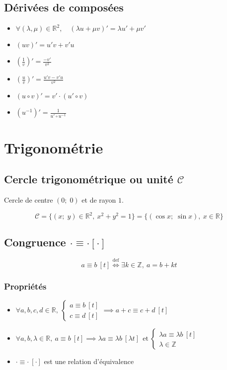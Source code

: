 \documentclass{article}
\newcommand{\R}{{\mathbb R}}
\newcommand{\Z}{{\mathbb Z}}
\newcommand{\et}{\:\text{et}\:}
\newcommand{\point}[2]{(#1;\;#2)}
\renewcommand{\cong}{\equiv}
\begin{document}
\subsection{Dérivées de composées}
\begin{itemize}
	\item $\forall (\lambda, \mu) \in \R^2,\quad (\lambda u + \mu v)' = \lambda u' + \mu v'$
	\item $(uv)' = u'v+v'u$
	\item $(\frac{1}{v})' = \frac{-v'}{v^2}$
	\item $(\frac{u}{v})' = \frac{u'v-v'u}{v^2}$
	\item $(u \circ v)' = v' \cdot  (u' \circ v)$
	\item $(u^{-1})' = \frac{1}{u' \circ u^{-1}}$
\end{itemize}

\newpage
\section{Trigonométrie}
\subsection{Cercle trigonométrique ou unité $\mathcal C$}

Cercle de centre $\point{0}{0}$ et de rayon $1$.

\[
	\mathcal C = \{ \point{x}{y} \in \R^2,\: x^2 + y^2 = 1 \} = \{ \point{\cos x}{\sin x},\: x \in \R \} 
\] 

\subsection{Congruence $\cdot \cong \cdot [\cdot]$}

\[
	a \cong b\ [t] \stackrel{\text{def}}{\iff} \exists k\in \Z,\ a = b + kt

\] 
\subsubsection{Propriétés}

\begin{itemize}
	\item $\forall a, b, c, d\in \R,\ \begin{cases}
			a \cong b\ [t]\\
			c \cong d\ [t]
		\end{cases} \implies a + c \cong c + d\ [t]$
	\item $\forall a, b, \lambda \in \R,\ a\cong b\ [t] \implies \lambda a \cong \lambda b\ [\lambda t] \ \et \begin{cases}
			\lambda a \cong \lambda b\ [t] \\
			\lambda \in \Z
	\end{cases}$
\item $ \cdot \cong \cdot \ [ \cdot ]$ est une relation d'équivalence
\end{itemize}
\end{document}
